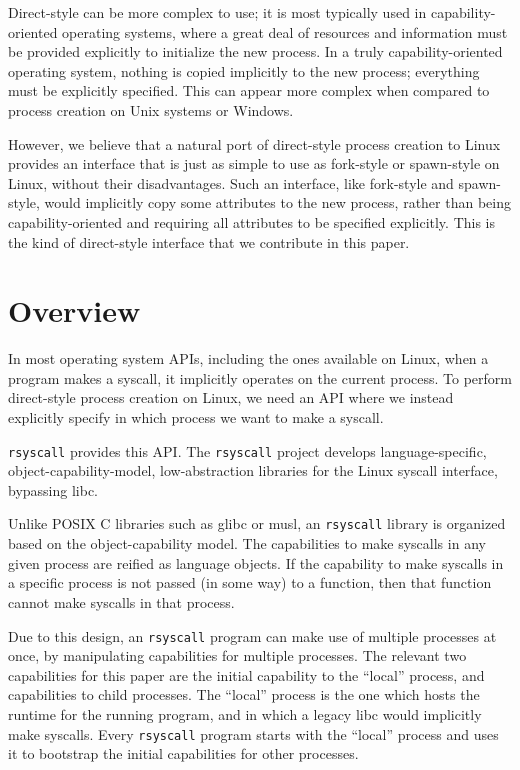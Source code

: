 \documentclass[letterpaper,twocolumn,10pt]{article}
\begin{document}
Direct-style can be more complex to use;
it is most typically used in capability-oriented operating systems,
where a great deal of resources and information must be provided explicitly to initialize the new process.
In a truly capability-oriented operating system,
nothing is copied implicitly to the new process;
everything must be explicitly specified.
This can appear more complex
when compared to process creation on Unix systems or Windows.

However, we believe that a natural port of direct-style process creation to Linux
provides an interface that is just as simple to use as fork-style or spawn-style on Linux,
without their disadvantages.
Such an interface, like fork-style and spawn-style,
would implicitly copy some attributes to the new process,
rather than being capability-oriented and requiring all attributes to be specified explicitly.
This is the kind of direct-style interface that we contribute in this paper.
\section{Overview}\label{overview}
In most operating system APIs, including the ones available on Linux,
when a program makes a syscall, it implicitly operates on the current process.
To perform direct-style process creation on Linux,
we need an API where we instead explicitly specify in which process we want to make a syscall.

\texttt{rsyscall} provides this API.
The \texttt{rsyscall} project develops
language-specific, object-capability-model, low-abstraction libraries for the Linux syscall interface,
bypassing libc.

Unlike POSIX C libraries such as glibc or musl,
an \texttt{rsyscall} library is organized based on the object-capability model.
The capabilities to make syscalls in any given process are reified as language objects.
If the capability to make syscalls in a specific process is not passed (in some way) to a function,
then that function cannot make syscalls in that process.

Due to this design, an \texttt{rsyscall} program can make use of multiple processes at once,
by manipulating capabilities for multiple processes.
The relevant two capabilities for this paper are the initial capability to the ``local'' process,
and capabilities to child processes.
The ``local'' process is the one which hosts the runtime for the running program,
and in which a legacy libc would implicitly make syscalls.
Every \texttt{rsyscall} program starts with the ``local'' process
and uses it to bootstrap the initial capabilities for other processes.
\end{document}
